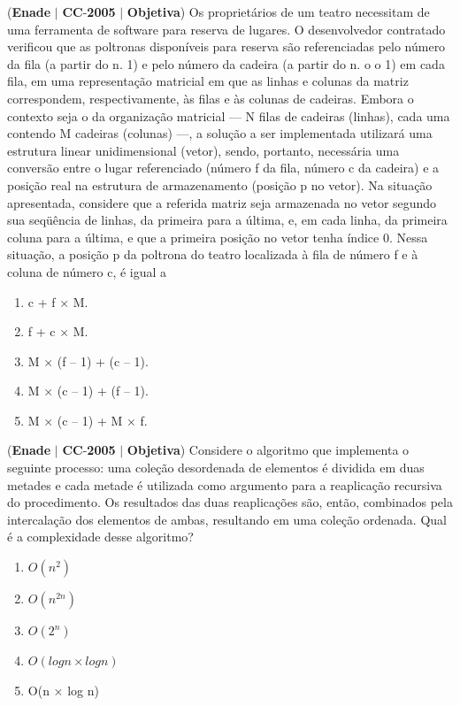 \documentclass{exam}
\begin{document}
\begin{questions}
\question (\textbf{Enade} $|$ \textbf{CC}-\textbf{2005} $|$ \textbf{Objetiva})
Os proprietários de um teatro necessitam de uma
ferramenta de software para reserva de lugares.
O desenvolvedor contratado verificou que as poltronas
disponíveis para reserva são referenciadas pelo número da fila
(a partir do n. 1) e pelo número da cadeira (a partir do n.
o o
1) em cada fila, em uma representação matricial em que as
linhas e colunas da matriz correspondem, respectivamente, às
filas e às colunas de cadeiras. Embora o contexto seja o da
organização matricial — N filas de cadeiras (linhas), cada uma
contendo M cadeiras (colunas) —, a solução a ser
implementada utilizará uma estrutura linear unidimensional
(vetor), sendo, portanto, necessária uma conversão entre o
lugar referenciado (número f da fila, número c da cadeira) e
a posição real na estrutura de armazenamento (posição p no
vetor).
Na situação apresentada, considere que a referida matriz seja
armazenada no vetor segundo sua seqüência de linhas, da primeira
para a última, e, em cada linha, da primeira coluna para a última,
e que a primeira posição no vetor tenha índice 0. Nessa situação,
a posição p da poltrona do teatro localizada à fila de número f e
à coluna de número c, é igual a
	\begin{enumerate}[label=\alph*)]
		\item  c + f × M.
		\item  f + c × M.
		\item  M × (f – 1) + (c – 1).
		\item  M × (c – 1) + (f – 1).
		\item  M × (c – 1) + M × f.
	\end{enumerate}

\question (\textbf{Enade} $|$ \textbf{CC}-\textbf{2005} $|$ \textbf{Objetiva})
Considere o algoritmo que implementa o seguinte processo: uma
coleção desordenada de elementos é dividida em duas metades e
cada metade é utilizada como argumento para a reaplicação
recursiva do procedimento. Os resultados das duas reaplicações
são, então, combinados pela intercalação dos elementos de ambas,
resultando em uma coleção ordenada. Qual é a complexidade desse
algoritmo?
	\begin{enumerate}[label=\alph*)]
		\item  $O(n^2)$
		\item  $O(n^{2n})$
		\item  $O(2^n)$
		\item  $O(log n × log n)$
		\item  O(n × log n)
	\end{enumerate}


\end{questions}
\end{document}
